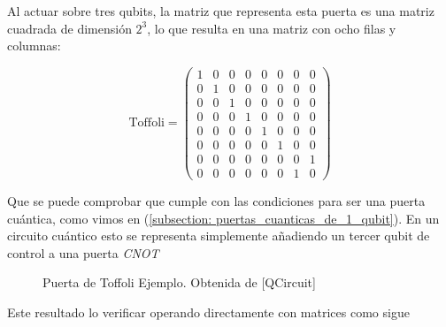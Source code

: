\documentclass[12pt]{article}
\numberwithin{equation}{section} %
\begin{document}
    \vspace{2.5mm}

    Al actuar sobre tres qubits, la matriz que representa esta puerta es una matriz cuadrada de dimensión \( 2^{3} \), lo que resulta en una matriz con ocho filas y columnas:

    \begin{equation}
        \text{Toffoli} = \begin{pmatrix}
            1 & 0 & 0 & 0 & 0 & 0 & 0 & 0 \\
            0 & 1 & 0 & 0 & 0 & 0 & 0 & 0 \\
            0 & 0 & 1 & 0 & 0 & 0 & 0 & 0 \\
            0 & 0 & 0 & 1 & 0 & 0 & 0 & 0 \\
            0 & 0 & 0 & 0 & 1 & 0 & 0 & 0 \\
            0 & 0 & 0 & 0 & 0 & 1 & 0 & 0 \\
            0 & 0 & 0 & 0 & 0 & 0 & 0 & 1 \\
            0 & 0 & 0 & 0 & 0 & 0 & 1 & 0 
        \end{pmatrix}
        \label{eq: toffoli_matriz}
    \end{equation}

    \vspace{2.5mm}

    Que se puede comprobar que cumple con las condiciones para ser una puerta cuántica, como vimos en (\ref{subsection: puertas_cuanticas_de_1_qubit}). En un circuito cuántico esto se representa simplemente añadiendo un tercer qubit de control a una puerta \textit{CNOT}

    \vspace{2.5mm}

    \begin{figure}[!h]
        \centering
        \caption{Puerta de Toffoli Ejemplo. Obtenida de [QCircuit]}\label{fig: puerta_toffoli_circuito_clasico}
    \end{figure}

    Este resultado lo verificar operando directamente con matrices como sigue
\end{document}

